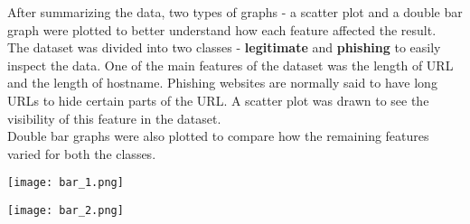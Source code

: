 After summarizing the data, two types of graphs - a scatter plot and a double bar graph were plotted to better understand how each feature affected the result.  \\

The dataset was divided into two classes - \textbf{legitimate} and \textbf{phishing} to easily inspect the data.
One of the main features of the dataset was the length of URL and the length of hostname. Phishing websites are normally said to have long URLs to hide certain parts of the URL. A scatter plot was drawn to see the  visibility of this feature  in the dataset. \\

Double bar graphs were also plotted to compare how the remaining features varied for both the classes. 


\begin{Figure}
	
 \centering
 \texttt{[image: bar\_1.png]}
 
 \texttt{[image: bar\_2.png]}
\end{Figure}
